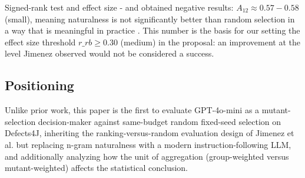 Signed-rank test and effect size - and obtained negative results: $A_{12} \approx 0.57-0.58$ (small), meaning naturalness is not significantly better than random selection in a way that is meaningful in practice \cite{jimenez2018naturalness}. This number is the basis for our setting the effect size threshold $r\_rb \ge 0.30$ (medium) in the proposal: an improvement at the level Jimenez observed would not be considered a success.
\subsection{Positioning}
Unlike prior work, this paper is the first to evaluate GPT-4o-mini as a
mutant-selection decision-maker against same-budget random fixed-seed selection on Defects4J,
inheriting the ranking-versus-random evaluation design of Jimenez et al.
\cite{jimenez2018naturalness} but replacing n-gram naturalness with a modern instruction-following
LLM, and additionally analyzing how the unit of aggregation (group-weighted versus
mutant-weighted) affects the statistical conclusion.